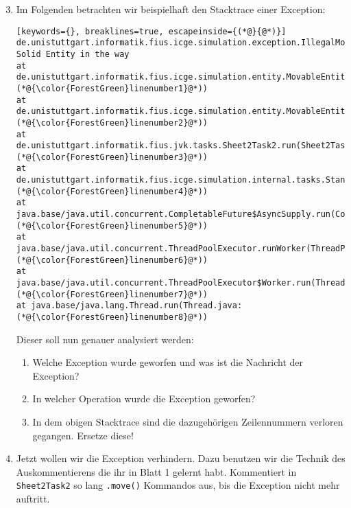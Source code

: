 \begin{enumerate}[label=\alph*)] \setcounter{enumi}{2}
    \item Im Folgenden betrachten wir beispielhaft den Stacktrace einer Exception:
        \begin{lstlisting}[keywords={}, breaklines=true, escapeinside={(*@}{@*)}]
de.unistuttgart.informatik.fius.icge.simulation.exception.IllegalMoveException: Solid Entity in the way
at de.unistuttgart.informatik.fius.icge.simulation.entity.MovableEntity.internalMove(MovableEntity.java:(*@{\color{ForestGreen}linenumber1}@*))
at de.unistuttgart.informatik.fius.icge.simulation.entity.MovableEntity.move(MovableEntity.java:(*@{\color{ForestGreen}linenumber2}@*))
at de.unistuttgart.informatik.fius.jvk.tasks.Sheet2Task2.run(Sheet2Task2.java:(*@{\color{ForestGreen}linenumber3}@*))
at de.unistuttgart.informatik.fius.icge.simulation.internal.tasks.StandardTaskRunner.executeTask(StandardTaskRunner.java:(*@{\color{ForestGreen}linenumber4}@*))
at java.base/java.util.concurrent.CompletableFuture$AsyncSupply.run(CompletableFuture.java:(*@{\color{ForestGreen}linenumber5}@*))
at java.base/java.util.concurrent.ThreadPoolExecutor.runWorker(ThreadPoolExecutor.java:(*@{\color{ForestGreen}linenumber6}@*))
at java.base/java.util.concurrent.ThreadPoolExecutor$Worker.run(ThreadPoolExecutor.java:(*@{\color{ForestGreen}linenumber7}@*))
at java.base/java.lang.Thread.run(Thread.java:(*@{\color{ForestGreen}linenumber8}@*))
        \end{lstlisting}

        Dieser soll nun genauer analysiert werden:

        \begin{enumerate}
            \item[i)] Welche Exception wurde geworfen und was ist die Nachricht der Exception?
            \item[ii)] In welcher Operation wurde die Exception geworfen?
            \item[iii)] In dem obigen Stacktrace sind die dazugehörigen Zeilennummern verloren gegangen. Ersetze diese!  
        \end{enumerate}

    \item Jetzt wollen wir die Exception verhindern.
        Dazu benutzen wir die Technik des Auskommentierens die ihr in Blatt 1 gelernt habt.
        Kommentiert in \lstinline{Sheet2Task2} so lang \lstinline{.move()} Kommandos aus, bis die Exception nicht mehr auftritt.


\end{enumerate}
